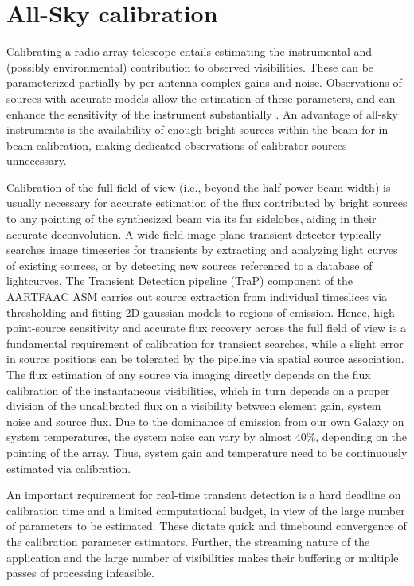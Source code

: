 \documentclass{aa}
\begin{document}
\section{\label{sec:Array-calibration-for}All-Sky calibration}
Calibrating  a radio  array telescope  entails estimating  the  instrumental and
(possibly environmental)  contribution to  observed visibilities.  These  can be
parameterized partially by per antenna  complex gains and noise. Observations of
sources with accurate  models allow the estimation of  these parameters, and can
enhance     the     sensitivity      of     the     instrument     substantially
\citep{taylor1999synthesis}.   An  advantage   of  all-sky  instruments  is  the
availability of enough  bright sources within the beam  for in-beam calibration,
making dedicated observations of calibrator sources unnecessary.

Calibration of the  full field of view (i.e., beyond the  half power beam width)
is usually necessary  for accurate estimation of the  flux contributed by bright
sources to any pointing of the synthesized beam via its far sidelobes, aiding in
their  accurate  deconvolution.  A  wide-field  image  plane transient  detector
typically searches  image timeseries for transients by  extracting and analyzing
light curves  of existing sources, or  by detecting new sources  referenced to a
database   of   lightcurves.     The   Transient   Detection   pipeline   (TraP)
\citep{swinbank2014trap}  component  of  the  AARTFAAC ASM  carries  out  source
extraction  from individual  timeslices via  thresholding and  fitting \mbox{2D}
gaussian models  to regions of  emission.  Hence, high  point-source sensitivity
and  accurate flux  recovery across  the  full field  of view  is a  fundamental
requirement  of calibration  for transient  searches,  while a  slight error  in
source  positions  can   be  tolerated  by  the  pipeline   via  spatial  source
association.  The flux estimation of  any source via imaging directly depends on
the flux calibration of the instantaneous visibilities, which in turn depends on
a proper division of the uncalibrated flux on a visibility between element gain,
system noise  and source flux.   Due to the  dominance of emission from  our own
Galaxy  on system  temperatures, the  system noise  can vary  by  almost $40\%$,
depending on the pointing of the  array.  Thus, system gain and temperature need
to be continuously estimated via calibration.

An important requirement for real-time transient detection is a hard deadline on
calibration time and a limited computational budget, in view of the large number
of parameters to be estimated.  These dictate quick and timebound convergence of
the  calibration parameter  estimators.  Further,  the streaming  nature  of the
application  and the  large  number  of visibilities  makes  their buffering  or
multiple passes of processing infeasible.
\end{document}
